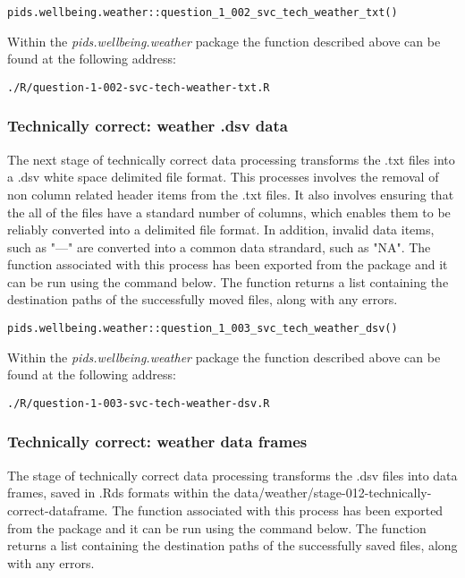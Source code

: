\documentclass[12pt, oneside, openany]{book}
\begin{document}
\begin{verbatim}
pids.wellbeing.weather::question_1_002_svc_tech_weather_txt()
\end{verbatim}

Within the \emph{pids.wellbeing.weather} package the function described above can be found at the following address:
\begin{verbatim}
./R/question-1-002-svc-tech-weather-txt.R
\end{verbatim}

\subsubsection*{Technically correct: weather .dsv data}

The next stage of technically correct data processing transforms the .txt files into a .dsv white space delimited file format. This processes involves the removal of non column related header items from the .txt files. It also involves ensuring that the all of the files have a standard number of columns, which enables them to be reliably converted into a delimited file format. In addition, invalid data items, such as "---" are converted into a common data strandard, such as "NA". The function associated with this process has been exported from the package and it can be run using the command below. The function returns a list containing the destination paths of the successfully moved files, along with any errors.

\begin{verbatim}
pids.wellbeing.weather::question_1_003_svc_tech_weather_dsv()
\end{verbatim}

Within the \emph{pids.wellbeing.weather} package the function described above can be found at the following address:
\begin{verbatim}
./R/question-1-003-svc-tech-weather-dsv.R
\end{verbatim}

\subsubsection*{Technically correct: weather data frames}

The stage of technically correct data processing transforms the .dsv files into data frames, saved in .Rds formats within the data/weather/stage-012-technically-correct-dataframe. The function associated with this process has been exported from the package and it can be run using the command below. The function returns a list containing the destination paths of the successfully saved files, along with any errors.
\end{document}

